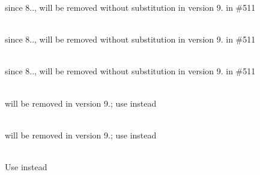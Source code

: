 \begin{DoxyRefList}
%
since 8.., will be removed without substitution in version 9. in \#511  
\item[Global \doxylink{class_sabberworm_1_1_c_s_s_1_1_rule_set_1_1_declaration_block_a7949b14e5ac5bfcc0c7580a0ef35b49d}{Declaration\+Block\+::expand\+List\+Style\+Shorthand} ()]\hfill \\
\label{deprecated__deprecated000413}%
%
since 8.., will be removed without substitution in version 9. in \#511  
\item[Global \doxylink{class_sabberworm_1_1_c_s_s_1_1_rule_set_1_1_declaration_block_af0432da015f2bfee3dd9d81d39d8b4e6}{Declaration\+Block\+::expand\+Shorthands} ()]\hfill \\
\label{deprecated__deprecated000407}%
%
since 8.., will be removed without substitution in version 9. in \#511  
\item[Global \doxylink{class_sabberworm_1_1_c_s_s_1_1_rule_set_1_1_declaration_block_aafa0f77afb62699a7be6e65127a06fbd}{Declaration\+Block\+::get\+Selector} ()]\hfill \\
\label{deprecated__deprecated000405}%
%
will be removed in version 9.; use {\ttfamily {}} instead  
\item[Global \doxylink{class_sabberworm_1_1_c_s_s_1_1_rule_set_1_1_declaration_block_a2f13b2c4d16ae806b2503410b7b4d234}{Declaration\+Block\+::set\+Selector} (\$m\+Selector, \$o\+List=null)]\hfill \\
\label{deprecated__deprecated000406}%
%
will be removed in version 9.; use {\ttfamily {}} instead  
\item[Class \doxylink{class_faker_1_1_default_generator}{Default\+Generator} ]\hfill \\
\label{deprecated__deprecated000059}%
%
Use  instead  
\item[Global \doxylink{class_faker_1_1_default_generator_a58ffd33948550ba0c0ce764acbce71ac}{Default\+Generator\+::\+\_\+\+\_\+get} (\$attribute)]\hfill \\

\end{DoxyRefList}
